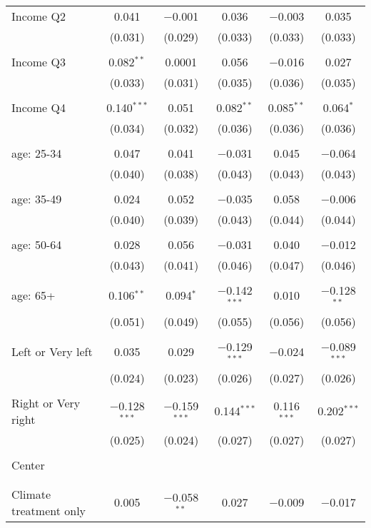 \begin{tabular}{@{\extracolsep{5pt}}lccccc}
 Income Q2 & 0.041 & $-$0.001 & 0.036 & $-$0.003 & 0.035 \\ 
  & (0.031) & (0.029) & (0.033) & (0.033) & (0.033) \\ 
  & & & & & \\ 
 Income Q3 & 0.082$^{**}$ & 0.0001 & 0.056 & $-$0.016 & 0.027 \\ 
  & (0.033) & (0.031) & (0.035) & (0.036) & (0.035) \\ 
  & & & & & \\ 
 Income Q4 & 0.140$^{***}$ & 0.051 & 0.082$^{**}$ & 0.085$^{**}$ & 0.064$^{*}$ \\ 
  & (0.034) & (0.032) & (0.036) & (0.036) & (0.036) \\ 
  & & & & & \\ 
 age: 25-34 & 0.047 & 0.041 & $-$0.031 & 0.045 & $-$0.064 \\ 
  & (0.040) & (0.038) & (0.043) & (0.043) & (0.043) \\ 
  & & & & & \\ 
 age: 35-49 & 0.024 & 0.052 & $-$0.035 & 0.058 & $-$0.006 \\ 
  & (0.040) & (0.039) & (0.043) & (0.044) & (0.044) \\ 
  & & & & & \\ 
 age: 50-64 & 0.028 & 0.056 & $-$0.031 & 0.040 & $-$0.012 \\ 
  & (0.043) & (0.041) & (0.046) & (0.047) & (0.046) \\ 
  & & & & & \\ 
 age: 65+ & 0.106$^{**}$ & 0.094$^{*}$ & $-$0.142$^{***}$ & 0.010 & $-$0.128$^{**}$ \\ 
  & (0.051) & (0.049) & (0.055) & (0.056) & (0.056) \\ 
  & & & & & \\ 
 Left or Very left & 0.035 & 0.029 & $-$0.129$^{***}$ & $-$0.024 & $-$0.089$^{***}$ \\ 
  & (0.024) & (0.023) & (0.026) & (0.027) & (0.026) \\ 
  & & & & & \\ 
 Right or Very right & $-$0.128$^{***}$ & $-$0.159$^{***}$ & 0.144$^{***}$ & 0.116$^{***}$ & 0.202$^{***}$ \\ 
  & (0.025) & (0.024) & (0.027) & (0.027) & (0.027) \\ 
  & & & & & \\ 
 Center &  &  &  &  &  \\ 
  &  &  &  &  &  \\ 
  & & & & & \\ 
 Climate treatment only & 0.005 & $-$0.058$^{**}$ & 0.027 & $-$0.009 & $-$0.017 \\ 

\end{tabular}
